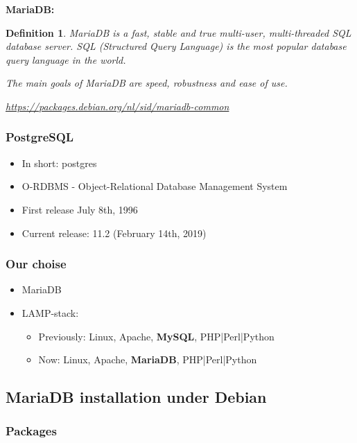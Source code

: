 \documentclass{article}
\newtheorem{theorem}{Definition}[section]
\begin{document}
\textbf{MariaDB:}

\begin{theorem}
    MariaDB is a fast, stable and true multi-user, multi-threaded SQL database server. 
    SQL (Structured Query Language) is the most popular database query language in the world. 
    
    The main goals of MariaDB are speed, robustness and ease of use.

    \url{https://packages.debian.org/nl/sid/mariadb-common}
\end{theorem}

\subsubsection{PostgreSQL}

\begin{itemize}
    \item In short: postgres
    \item O-RDBMS - Object-Relational Database Management System
    \item First release July 8th, 1996
    \item Current release: 11.2 (February 14th, 2019)
\end{itemize}

\subsubsection{Our choise}

\begin{itemize}
    \item MariaDB
    \item LAMP-stack:
    \begin{itemize}
        \item Previously: Linux, Apache, \textbf{MySQL}, PHP|Perl|Python
        \item Now: Linux, Apache, \textbf{MariaDB}, PHP|Perl|Python
    \end{itemize}
\end{itemize}

\subsection{MariaDB installation under Debian}

\subsubsection{Packages}
\end{document}
